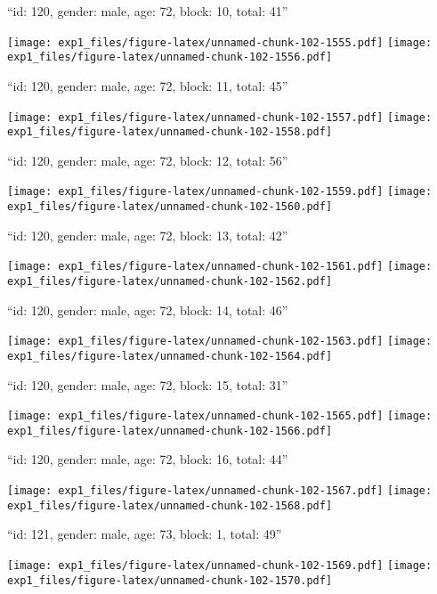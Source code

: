 \documentclass[11pt,,]{article}
\begin{document}
\newpage
[1] 

``id: 120, gender: male, age: 72, block: 10, total: 41''

\texttt{[image: exp1\_files/figure-latex/unnamed-chunk-102-1555.pdf]}
\texttt{[image: exp1\_files/figure-latex/unnamed-chunk-102-1556.pdf]}

\newpage
[1] 

``id: 120, gender: male, age: 72, block: 11, total: 45''

\texttt{[image: exp1\_files/figure-latex/unnamed-chunk-102-1557.pdf]}
\texttt{[image: exp1\_files/figure-latex/unnamed-chunk-102-1558.pdf]}

\newpage
[1] 

``id: 120, gender: male, age: 72, block: 12, total: 56''

\texttt{[image: exp1\_files/figure-latex/unnamed-chunk-102-1559.pdf]}
\texttt{[image: exp1\_files/figure-latex/unnamed-chunk-102-1560.pdf]}

\newpage
[1] 

``id: 120, gender: male, age: 72, block: 13, total: 42''

\texttt{[image: exp1\_files/figure-latex/unnamed-chunk-102-1561.pdf]}
\texttt{[image: exp1\_files/figure-latex/unnamed-chunk-102-1562.pdf]}

\newpage
[1] 

``id: 120, gender: male, age: 72, block: 14, total: 46''

\texttt{[image: exp1\_files/figure-latex/unnamed-chunk-102-1563.pdf]}
\texttt{[image: exp1\_files/figure-latex/unnamed-chunk-102-1564.pdf]}

\newpage
[1] 

``id: 120, gender: male, age: 72, block: 15, total: 31''

\texttt{[image: exp1\_files/figure-latex/unnamed-chunk-102-1565.pdf]}
\texttt{[image: exp1\_files/figure-latex/unnamed-chunk-102-1566.pdf]}

\newpage
[1] 

``id: 120, gender: male, age: 72, block: 16, total: 44''

\texttt{[image: exp1\_files/figure-latex/unnamed-chunk-102-1567.pdf]}
\texttt{[image: exp1\_files/figure-latex/unnamed-chunk-102-1568.pdf]}

\newpage
[1] 

``id: 121, gender: male, age: 73, block: 1, total: 49''

\texttt{[image: exp1\_files/figure-latex/unnamed-chunk-102-1569.pdf]}
\texttt{[image: exp1\_files/figure-latex/unnamed-chunk-102-1570.pdf]}
\end{document}
